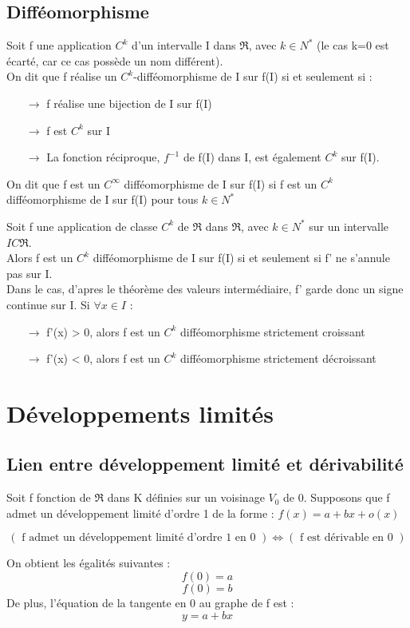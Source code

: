 \subsection{Difféomorphisme}
\begin{de}
Soit f une application $C^k$ d'un intervalle I dans $\Re$, avec $k \in N^*$ (le cas k=0 est écarté, car ce cas possède un nom différent).\\
On dit que f réalise un $C^k$-difféomorphisme de I sur f(I) si et seulement si : 
\begin{itemize}
 \item[$\rightarrow$] f réalise une bijection de I sur f(I)
 \item[$\rightarrow$] f est $C^k$ sur I
 \item[$\rightarrow$] La fonction réciproque, $f^{-1}$ de f(I) dans I, est également $C^k$ sur f(I).
\end{itemize}
On dit que f est un $C^{\infty}$ difféomorphisme de I sur f(I) si f est un $C^k$ difféomorphisme de I sur f(I) pour tous $k \in N^*$
\end{de}
\begin{theo}
Soit f une application de classe $C^k$ de $\Re$ dans $\Re$, avec $k \in N^*$ sur un intervalle $I C \Re$.\\
Alors f est un $C^k$ difféomorphisme de I sur f(I) si et seulement si f' ne s'annule pas sur I.\\
Dans le cas, d'apres le théorème des valeurs intermédiaire, f' garde donc un signe continue sur I. Si $ \forall x \in I$ : 
\begin{itemize}
 \item[$\rightarrow$] f'(x) > 0, alors f est un $C^k$ difféomorphisme strictement croissant
 \item[$\rightarrow$] f'(x) < 0, alors f est un $C^k$ difféomorphisme strictement décroissant
\end{itemize}
\end{theo}
\section{Développements limités}
\subsection{Lien entre développement limité et dérivabilité}
Soit f fonction de $\Re$ dans K définies sur un voisinage $V_0$ de 0.
Supposons que f admet un développement limité d'ordre 1 de la forme : $f(x) = a + bx + o(x)$
\begin{prop}
$$(\mbox{ f admet un développement limité d'ordre 1 en 0 }) \Leftrightarrow ( \mbox{ f est dérivable en 0 })$$
\end{prop}
\begin{prop}
On obtient les égalités suivantes :
$$f(0) = a$$
$$f(0) = b$$
De plus, l'équation de la tangente en 0 au graphe de f est :
$$y=a+bx$$
\end{prop}
